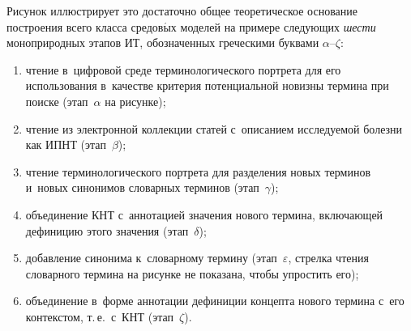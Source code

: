 \begin{multicols}{2}
  Рисунок иллюстрирует это достаточно общее теоретическое основание 
построения всего класса средов$\acute{\mbox{ы}}$х моделей на примере 
следующих \textit{шести} моноприродных этапов ИТ, обозначенных 
греческими буквами $\alpha$--$\zeta$:
  \begin{enumerate}[(1)]
  \item чтение в~цифровой среде терминологического портрета для его 
использования в~качестве критерия потенциальной новизны термина при 
поиске (этап~$\alpha$ на рисунке);\\[-15pt]
  \item чтение из электронной коллекции статей с~описанием исследуемой 
болезни как ИПНТ (этап~$\beta$);\\[-15pt]
  \item  чтение терминологического портрета для разделения новых 
терминов и~новых синонимов словарных терминов (этап~$\gamma$);\\[-15pt]
  \item  объединение КНТ с~аннотацией значения нового термина, 
включающей дефиницию этого значения (этап~$\delta$);\\[-15pt]
  \item добавление синонима к~словарному термину (этап~$\varepsilon$, 
стрелка чтения словарного термина на рисунке не показана, чтобы упростить 
его);\\[-15pt]
  \item объединение в~форме аннотации дефиниции концепта нового 
термина с~его контекстом, т.\,е.\ с~КНТ (этап~$\zeta$).
  \end{enumerate}
  

\end{multicols}

